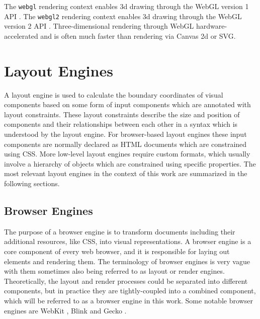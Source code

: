 The \lstinline{webgl} rendering context enables 3d drawing through the
WebGL version 1 API \parencite{WebGL1}. The \lstinline{webgl2}
rendering context enables 3d drawing through the WebGL version 2 API
\parencite{WebGL2}. Three-dimensional rendering through WebGL
hardware-accelerated and is often much faster than rendering via
Canvas 2d or SVG.

%









\section{Layout Engines}
\label{sec:LayoutEngines}

A layout engine is used to calculate the boundary coordinates of
visual components based on some form of input components which are
annotated with layout constraints.  These layout constraints describe
the size and position of components and their relationships between
each other in a syntax which is understood by the layout engine.  For
browser-based layout engines these input components are normally
declared as HTML documents which are constrained using CSS.  More
low-level layout engines require custom formats, which usually involve
a hierarchy of objects which are constrained using specific
properties.  The most relevant layout engines in the context of this
work are summarized in the following sections.

\subsection{Browser Engines}
\label{sec:BrowserEngines}

The purpose of a browser engine is to transform documents including
their additional resources, like CSS, into visual representations.  A
browser engine is a core component of every web browser, and it is
responsible for laying out elements and rendering them.  The
terminology of browser engines is very vague with them sometimes also
being referred to as layout or render engines.  Theoretically, the
layout and render processes could be separated into different
components, but in practice they are tightly-coupled into a combined
component, which will be referred to as a browser engine in this work.
Some notable browser engines are WebKit \parencite{WebKit}, Blink
\parencite{Blink} and Gecko \parencite{Gecko}.

